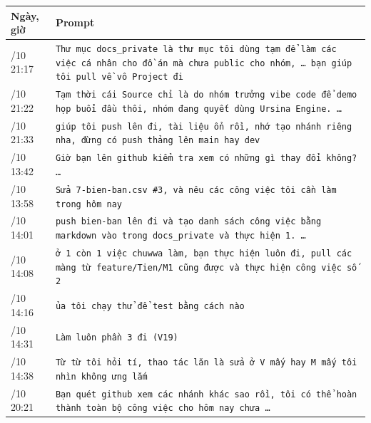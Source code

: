 {\def\LTcaptype{none} %
\begin{longtable}[]{@{}
  >{\raggedright\arraybackslash}p{}
  >{\raggedright\arraybackslash}p{}@{}}
\toprule\noalign{}
\rowcolor{tablehead}\begin{minipage}[b]{\linewidth}\raggedright
\textbf{Ngày, giờ}
\end{minipage} & \begin{minipage}[b]{\linewidth}\raggedright
\textbf{Prompt}
\end{minipage} \\
\midrule\noalign{}
\endhead
\bottomrule\noalign{}
\endlastfoot
19/10 21:17 & \texttt{Thư mục docs\_\allowbreak{}private là thư mục tôi dùng tạm để làm các việc cá nhân cho đồ án mà chưa public cho nhóm, … bạn giúp tôi pull về vô Project đi} \\
\rowrule
19/10 21:22 & \texttt{Tạm thời cái Source chỉ là do nhóm trưởng vibe code để demo họp buổi đầu thôi, nhóm đang quyết dùng Ursina Engine.\allowbreak{} …} \\
\rowrule
19/10 21:33 & \texttt{giúp tôi push lên đi, tài liệu ổn rồi, nhớ tạo nhánh riêng nha, đừng có push thảng lên main hay dev} \\
\rowrule
21/10 13:42 & \texttt{Giờ bạn lên github kiểm tra xem có những gì thay đổi không? …} \\
\rowrule
21/10 13:58 & \texttt{Sửa 7-\allowbreak{}bien-\allowbreak{}ban.\allowbreak{}csv \#3, và nêu các công việc tôi cần làm trong hôm nay} \\
\rowrule
21/10 14:01 & \texttt{push bien-\allowbreak{}ban lên đi và tạo danh sách công việc bằng markdown vào trong docs\_\allowbreak{}private và thực hiện 1.\allowbreak{} …} \\
\rowrule
21/10 14:08 & \texttt{ở 1 còn 1 việc chuwwa làm, bạn thực hiện luôn đi, pull các màng từ feature/\allowbreak{}Tien/\allowbreak{}M1 cũng được và thực hiện công việc số 2} \\
\rowrule
21/10 14:16 & \texttt{ủa tôi chạy thử để test bằng cách nào} \\
\rowrule
21/10 14:31 & \texttt{Làm luôn phần 3 đi (V19)} \\
\rowrule
21/10 14:38 & \texttt{Từ từ tôi hỏi tí, thao tác lăn là sửa ở V mấy hay M mấy tôi nhìn không ưng lắm} \\
\rowrule
21/10 20:21 & \texttt{Bạn quét github xem các nhánh khác sao rồi, tôi có thể hoàn thành toàn bộ công việc cho hôm nay chưa …} \\

\end{longtable}}
